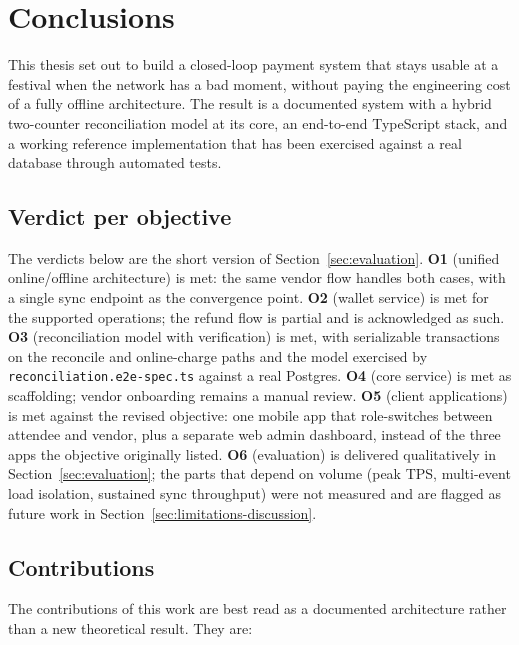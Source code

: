 \chapter{Conclusions}
\label{chap:conclusions}

This thesis set out to build a closed-loop payment system that stays usable at a festival when the network has a bad moment, without paying the engineering cost of a fully offline architecture. The result is a documented system with a hybrid two-counter reconciliation model at its core, an end-to-end TypeScript stack, and a working reference implementation that has been exercised against a real database through automated tests.

\section{Verdict per objective}
\label{sec:objectives-verdict}

The verdicts below are the short version of Section~\ref{sec:evaluation}. \textbf{O1} (unified online/offline architecture) is met: the same vendor flow handles both cases, with a single sync endpoint as the convergence point. \textbf{O2} (wallet service) is met for the supported operations; the refund flow is partial and is acknowledged as such. \textbf{O3} (reconciliation model with verification) is met, with serializable transactions on the reconcile and online-charge paths and the model exercised by \texttt{reconciliation.e2e-spec.ts} against a real Postgres. \textbf{O4} (core service) is met as scaffolding; vendor onboarding remains a manual review. \textbf{O5} (client applications) is met against the revised objective: one mobile app that role-switches between attendee and vendor, plus a separate web admin dashboard, instead of the three apps the objective originally listed. \textbf{O6} (evaluation) is delivered qualitatively in Section~\ref{sec:evaluation}; the parts that depend on volume (peak TPS, multi-event load isolation, sustained sync throughput) were not measured and are flagged as future work in Section~\ref{sec:limitations-discussion}.

\section{Contributions}
\label{sec:contributions}

The contributions of this work are best read as a documented architecture rather than a new theoretical result. They are:

